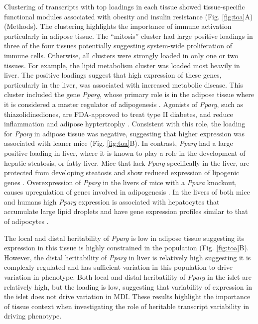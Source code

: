\documentclass[
]{article}
\begin{document}
Clustering of transcripts with top loadings in each tissue showed
tissue-specific functional modules associated with obesity and insulin
resistance (Fig. \ref{fig:toa}A) (Methods). The clustering highlights
the importance of immune activation particularly in adipose tissue. The
``mitosis'' cluster had large positive loadings in three of the four
tissues potentially suggesting system-wide proliferation of immune
cells. Otherwise, all clusters were strongly loaded in only one or two
tissues. For example, the lipid metabolism cluster was loaded most
heavily in liver. The positive loadings suggest that high expression of
these genes, particularly in the liver, was associated with increased
metabolic disease. This cluster included the gene \textit{Pparg}, whose
primary role is in the adipose tissue where it is considered a master
regulator of adipogenesis \cite{pmid17389767}. Agonists of
\textit{Pparg}, such as thiazolidinediones, are FDA-approved to treat
type II diabetes, and reduce inflammation and adipose hyptertrophy
\cite{pmid17389767}. Consistent with this role, the loading for
\textit{Pparg} in adipose tissue was negative, suggesting that higher
expression was associated with leaner mice (Fig. \ref{fig:toa}B). In
contrast, \textit{Pparg} had a large positive loading in liver, where it
is known to play a role in the development of hepatic steatosis, or
fatty liver. Mice that lack \textit{Pparg} specifically in the liver,
are protected from developing steatosis and show reduced expression of
lipogenic genes \cite{pmid12805374, pmid12618528}. Overexpression of
\textit{Pparg} in the livers of mice with a \textit{Ppara} knockout,
causes upregulation of genes involved in adipogenesis
\cite{pmid16357043}. In the livers of both mice and humans high
\textit{Pparg} expression is associated with hepatocytes that accumulate
large lipid droplets and have gene expression profiles similar to that
of adipocytes \cite{pmid15644454, pmid16403437}.

The local and distal heritability of \textit{Pparg} is low in adipose
tissue suggesting its expression in this tissue is highly constrained in
the population (Fig. \ref{fig:toa}B). However, the distal heritability
of \textit{Pparg} in liver is relatively high suggesting it is complexly
regulated and has sufficient variation in this population to drive
variation in phenotype. Both local and distal heribatility of
\textit{Pparg} in the islet are relatively high, but the loading is low,
suggesting that variability of expression in the islet does not drive
variation in MDI. These results highlight the importance of tissue
context when investigating the role of heritable transcript variability
in driving phenotype.
\end{document}
